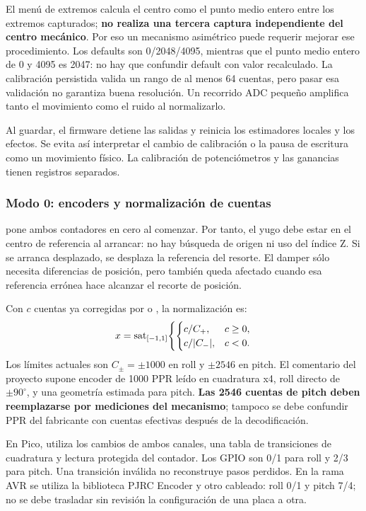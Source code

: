 El menú de extremos calcula el centro como el punto medio entero entre los extremos capturados; \textbf{no realiza una tercera captura independiente del centro mecánico}. Por eso un mecanismo asimétrico puede requerir mejorar ese procedimiento. Los defaults son 0/2048/4095, mientras que el punto medio entero de 0 y 4095 es 2047: no hay que confundir default con valor recalculado. La calibración persistida valida un rango de al menos 64 cuentas, pero pasar esa validación no garantiza buena resolución. Un recorrido ADC pequeño amplifica tanto el movimiento como el ruido al normalizarlo.

Al guardar, el firmware detiene las salidas y reinicia los estimadores locales y los efectos. Se evita así interpretar el cambio de calibración o la pausa de escritura como un movimiento físico. La calibración de potenciómetros y las ganancias tienen registros separados.

\subsubsection{Modo 0: encoders y normalización de cuentas}
 pone ambos contadores en cero al comenzar. Por tanto, el yugo debe estar en el centro de referencia al arrancar: no hay búsqueda de origen ni uso del índice Z. Si se arranca desplazado, se desplaza la referencia del resorte. El damper sólo necesita diferencias de posición, pero también queda afectado cuando esa referencia errónea hace alcanzar el recorte de posición.

Con $c$ cuentas ya corregidas por  o , la normalización es:
\begin{equation}
x=\operatorname{sat}_{[-1,1]}\!\left\{\begin{cases}
c/C_+,&c\ge0,\\
c/|C_-|,&c<0.
\end{cases}\right.
\end{equation}
Los límites actuales son $C_\pm=\pm1000$ en roll y $\pm2546$ en pitch. El comentario del proyecto supone encoder de 1000 PPR leído en cuadratura x4, roll directo de $\pm90^\circ$, y una geometría estimada para pitch. \textbf{Las 2546 cuentas de pitch deben reemplazarse por mediciones del mecanismo}; tampoco se debe confundir PPR del fabricante con cuentas efectivas después de la decodificación.

En Pico,  utiliza los cambios de ambos canales, una tabla de transiciones de cuadratura y lectura protegida del contador. Los GPIO son 0/1 para roll y 2/3 para pitch. Una transición inválida no reconstruye pasos perdidos. En la rama AVR se utiliza la biblioteca PJRC Encoder y otro cableado: roll 0/1 y pitch 7/4; no se debe trasladar sin revisión la configuración de una placa a otra.

